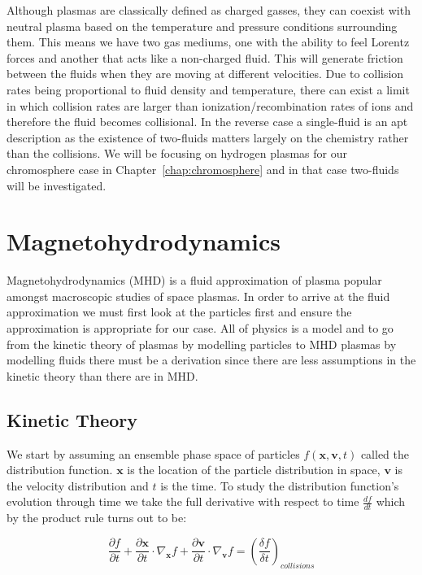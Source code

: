 \documentclass[12pt,upcase]{umlthesis}
\begin{document}
Although plasmas are classically defined as charged gasses, they can coexist with neutral plasma based on the temperature and pressure conditions surrounding them. This means we have two gas mediums, one with the ability to feel Lorentz forces and another that acts like a non-charged fluid. This will generate friction between the fluids when they are moving at different velocities. Due to collision rates being proportional to fluid density and temperature, there can exist a limit in which collision rates are larger than ionization/recombination rates of ions and therefore the fluid becomes collisional. In the reverse case a single-fluid is an apt description as the existence of two-fluids matters largely on the chemistry rather than the collisions. We will be focusing on hydrogen plasmas for our chromosphere case in Chapter~\ref{chap:chromosphere} and in that case two-fluids will be investigated.

\section{Magnetohydrodynamics}\label{sec:mhd}

Magnetohydrodynamics (MHD) is a fluid approximation of plasma popular amongst macroscopic studies of space plasmas. In order to arrive at the fluid approximation we must first look at the particles first and ensure the approximation is appropriate for our case. All of physics is a model and to go from the kinetic theory of plasmas by modelling particles to MHD plasmas by modelling fluids there must be a derivation since there are less assumptions in the kinetic theory than there are in MHD\@.

\subsection{Kinetic Theory}\label{sec:kinetictheory}

We start by assuming an ensemble phase space of particles $f(\textbf{x}, \textbf{v}, t)$ called the distribution function. $\textbf{x}$ is the location of the particle distribution in space, $\textbf{v}$ is the velocity distribution and $t$ is the time. To study the distribution function's evolution through time we take the full derivative with respect to time $\frac{df}{dt}$ which by the product rule turns out to be:

\begin{equation}
	\frac{\partial f}{\partial t} + \frac{\partial \textbf{x}}{\partial t} \cdot \nabla_{\textbf{x}} f + \frac{\partial \textbf{v}}{\partial t} \cdot \nabla_{\textbf{v}} f = {(\frac{\delta f}{\delta t})}_{collisions}
\end{equation}
\end{document}
